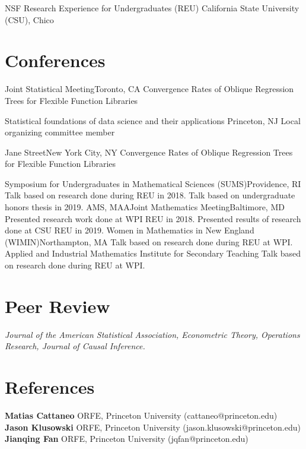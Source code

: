 \documentclass[10pt,a4paper,roman]{moderncv}        %
\begin{document}
{NSF Research Experience for Undergraduates (REU)}
{California State University (CSU), Chico}
{}
{}

\section{Conferences}
{Joint Statistical Meeting}{Toronto, CA}
{}{Convergence Rates of Oblique Regression Trees for Flexible Function Libraries}

{Statistical foundations of data science and their applications}
{Princeton, NJ}
{}{Local organizing committee member}

{Jane Street}{New York City, NY}
{}{Convergence Rates of Oblique Regression Trees for Flexible Function Libraries}

{Symposium for Undergraduates in Mathematical Sciences (SUMS)}{Providence, RI}
{}{Talk based on research done during REU in 2018.
  Talk based on undergraduate honors thesis in 2019.}
{AMS, MAA}{Joint Mathematics Meeting}{Baltimore, MD}
{}{Presented research work done at WPI REU in 2018.
  Presented results of research done at CSU REU in 2019.}
{Women in Mathematics in New England (WIMIN)}{Northampton, MA}
{}{Talk based on research done during REU at WPI.}
{Applied and Industrial Mathematics Institute for Secondary Teaching}
{Talk based on research done during REU at WPI.}

\section{Peer Review}
\textit{
Journal of the American Statistical Association, Econometric Theory, Operations
Research, Journal of Causal Inference.
}

\section{References}
\textbf{Matias Cattaneo} ORFE, Princeton University (cattaneo@princeton.edu)\\
\textbf{Jason Klusowski} ORFE, Princeton University (jason.klusowski@princeton.edu)\\
\textbf{Jianqing Fan} ORFE, Princeton University (jqfan@princeton.edu)


\clearpage
\end{document}
